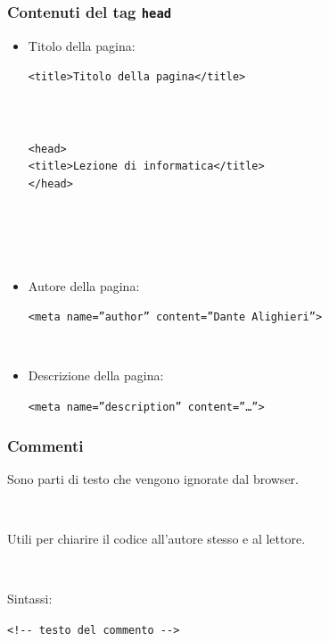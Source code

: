 \documentclass[]{beamer}
\begin{document}
\begin{frame}[fragile]
\frametitle{Contenuti del tag \texttt{head}}
\begin{itemize}
  \item Titolo della pagina:
  \begin{center}
  \alert<1>{\texttt{<title>Titolo della pagina</title>}}\pause
  \end{center}
  ~
\begin{columns}
\begin{column}{0.5\textwidth}
\begin{scriptsize}
\begin{verbatim}
<head>
<title>Lezione di informatica</title>
</head>
\end{verbatim}
\end{scriptsize}
\end{column}
\begin{column}{0.3\textwidth}
\end{column}
\end{columns}\pause
~

~
  \item Autore della pagina:
  \begin{center}
  \alert<3>{\texttt{<meta name=''author'' content=''Dante Alighieri''>}}
  \end{center}~\pause
  \item Descrizione della pagina:
  \begin{center}
  \alert<4>{\texttt{<meta name=''description'' content=''\ldots''>}}
  \end{center}
\end{itemize}
\end{frame}




\begin{frame}[fragile]
\frametitle{Commenti}
Sono parti di testo che vengono ignorate dal browser. 

~

Utili per chiarire il codice all'autore stesso e al lettore.\pause
  
~
  
Sintassi:
\begin{center}
\texttt{<!{-}{-} testo del commento {-}{-}>}
\end{center}

\end{frame}
\end{document}
